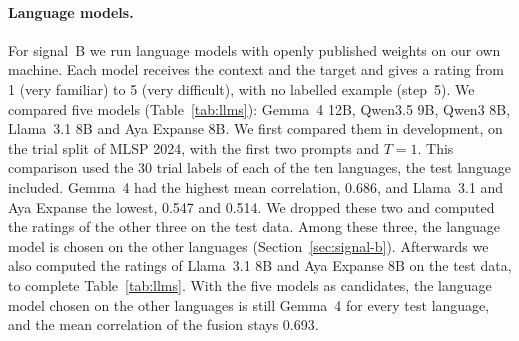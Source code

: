 \paragraph{Language models.} For signal~B we run language models with openly published weights on %
our own machine. Each model receives the context and the target and gives a rating from 1 (very
familiar) to 5 (very difficult), with no labelled example (step~5). We compared five models %
(Table~\ref{tab:llms}): Gemma~4 12B, Qwen3.5 9B, Qwen3 8B, Llama~3.1 8B and Aya Expanse 8B. We
first compared them in development, on the trial split of MLSP 2024, with the first two prompts and %
$T = 1$. This comparison used the 30 trial labels of each of the ten languages, the test language
included. Gemma~4 had the highest mean correlation, 0.686, and Llama~3.1 and Aya Expanse the %
lowest, 0.547 and 0.514. We dropped these two and computed the ratings of the other three on the
test data. Among these three, the language model is chosen on the other languages %
(Section~\ref{sec:signal-b}). Afterwards we also computed the ratings of Llama~3.1 8B and Aya %
Expanse 8B on the test data, to complete Table~\ref{tab:llms}. With the five models as candidates, %
the language model chosen on the other languages is still Gemma~4 for every test language, and the
mean correlation of the fusion stays 0.693.


